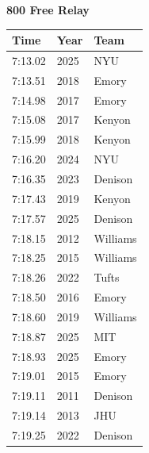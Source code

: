 \noindent\begin{minipage}[t]{0.98\textwidth}
\centering
\textbf{\textcolor{teamprimary}{800 Free Relay}}\par
\vspace{0.5em}
\centering
\small
\renewcommand{\arraystretch}{1.0}
\setlength{\tabcolsep}{4pt}
\begin{tabular}{@{}p{4.5cm}p{2.5cm}p{4.5cm}@{}}
\toprule
\textbf{Time} & \textbf{Year} & \textbf{Team} \\
\midrule
7:13.02 & 2025 & NYU \\
7:13.51 & 2018 & Emory \\
7:14.98 & 2017 & Emory \\
7:15.08 & 2017 & Kenyon \\
7:15.99 & 2018 & Kenyon \\
7:16.20 & 2024 & NYU \\
7:16.35 & 2023 & Denison \\
7:17.43 & 2019 & Kenyon \\
7:17.57 & 2025 & Denison \\
7:18.15 & 2012 & Williams \\
7:18.25 & 2015 & Williams \\
7:18.26 & 2022 & Tufts \\
7:18.50 & 2016 & Emory \\
7:18.60 & 2019 & Williams \\
7:18.87 & 2025 & MIT \\
7:18.93 & 2025 & Emory \\
7:19.01 & 2015 & Emory \\
7:19.11 & 2011 & Denison \\
7:19.14 & 2013 & JHU \\
7:19.25 & 2022 & Denison \\
\bottomrule
\end{tabular}
\end{minipage}
\vspace{1.2em}
